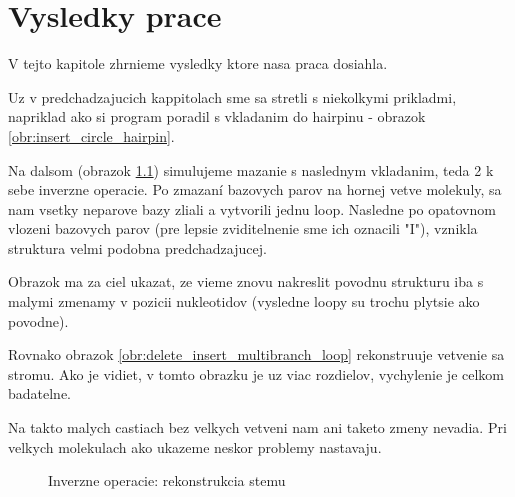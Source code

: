 
\chapter{Vysledky prace}

V tejto kapitole zhrnieme vysledky ktore nasa praca dosiahla.

Uz v predchadzajucich kappitolach sme sa stretli s niekolkymi prikladmi, napriklad ako si
program poradil s vkladanim do hairpinu - obrazok \ref{obr:insert_circle_hairpin}.

Na dalsom (obrazok \ref{obr:delete_insert_multibranch}) simulujeme mazanie s naslednym vkladanim,
teda 2 k sebe inverzne operacie. Po zmazaní bazovych parov na hornej vetve molekuly, sa nam vsetky
neparove bazy zliali a vytvorili jednu loop. Nasledne po opatovnom vlozeni bazovych parov (pre lepsie
zviditelnenie sme ich oznacili "I"), vznikla struktura velmi podobna predchadzajucej.

Obrazok ma za ciel ukazat, ze vieme znovu nakreslit povodnu strukturu iba s malymi zmenamy v pozicii
nukleotidov (vysledne loopy su trochu plytsie ako povodne).

Rovnako obrazok \ref{obr:delete_insert_multibranch_loop} rekonstruuje vetvenie sa stromu. Ako je vidiet,
v tomto obrazku je uz viac rozdielov, vychylenie je celkom badatelne.

Na takto malych castiach bez velkych vetveni nam ani taketo zmeny nevadia. Pri velkych molekulach
ako ukazeme neskor problemy nastavaju.

\begin{figure}[H]
  \begin{subfigure}{0.3\textwidth}
  \end{subfigure}
  \begin{subfigure}{0.3\textwidth}
  \end{subfigure}
  \begin{subfigure}{0.3\textwidth}
  \end{subfigure}
  \caption{Inverzne operacie: rekonstrukcia stemu}
  \label{obr:delete_insert_multibranch}
\end{figure}


